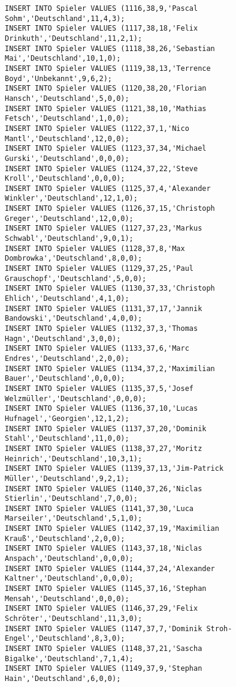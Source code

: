 \documentclass{bschlangaul-aufgabe}
\begin{document}
\begin{verbatim}
INSERT INTO Spieler VALUES (1116,38,9,'Pascal Sohm','Deutschland',11,4,3);
INSERT INTO Spieler VALUES (1117,38,18,'Felix Drinkuth','Deutschland',11,2,1);
INSERT INTO Spieler VALUES (1118,38,26,'Sebastian Mai','Deutschland',10,1,0);
INSERT INTO Spieler VALUES (1119,38,13,'Terrence Boyd','Unbekannt',9,6,2);
INSERT INTO Spieler VALUES (1120,38,20,'Florian Hansch','Deutschland',5,0,0);
INSERT INTO Spieler VALUES (1121,38,10,'Mathias Fetsch','Deutschland',1,0,0);
INSERT INTO Spieler VALUES (1122,37,1,'Nico Mantl','Deutschland',12,0,0);
INSERT INTO Spieler VALUES (1123,37,34,'Michael Gurski','Deutschland',0,0,0);
INSERT INTO Spieler VALUES (1124,37,22,'Steve Kroll','Deutschland',0,0,0);
INSERT INTO Spieler VALUES (1125,37,4,'Alexander Winkler','Deutschland',12,1,0);
INSERT INTO Spieler VALUES (1126,37,15,'Christoph Greger','Deutschland',12,0,0);
INSERT INTO Spieler VALUES (1127,37,23,'Markus Schwabl','Deutschland',9,0,1);
INSERT INTO Spieler VALUES (1128,37,8,'Max Dombrowka','Deutschland',8,0,0);
INSERT INTO Spieler VALUES (1129,37,25,'Paul Grauschopf','Deutschland',5,0,0);
INSERT INTO Spieler VALUES (1130,37,33,'Christoph Ehlich','Deutschland',4,1,0);
INSERT INTO Spieler VALUES (1131,37,17,'Jannik Bandowski','Deutschland',4,0,0);
INSERT INTO Spieler VALUES (1132,37,3,'Thomas Hagn','Deutschland',3,0,0);
INSERT INTO Spieler VALUES (1133,37,6,'Marc Endres','Deutschland',2,0,0);
INSERT INTO Spieler VALUES (1134,37,2,'Maximilian Bauer','Deutschland',0,0,0);
INSERT INTO Spieler VALUES (1135,37,5,'Josef Welzmüller','Deutschland',0,0,0);
INSERT INTO Spieler VALUES (1136,37,10,'Lucas Hufnagel','Georgien',12,1,2);
INSERT INTO Spieler VALUES (1137,37,20,'Dominik Stahl','Deutschland',11,0,0);
INSERT INTO Spieler VALUES (1138,37,27,'Moritz Heinrich','Deutschland',10,3,1);
INSERT INTO Spieler VALUES (1139,37,13,'Jim-Patrick Müller','Deutschland',9,2,1);
INSERT INTO Spieler VALUES (1140,37,26,'Niclas Stierlin','Deutschland',7,0,0);
INSERT INTO Spieler VALUES (1141,37,30,'Luca Marseiler','Deutschland',5,1,0);
INSERT INTO Spieler VALUES (1142,37,19,'Maximilian Krauß','Deutschland',2,0,0);
INSERT INTO Spieler VALUES (1143,37,18,'Niclas Anspach','Deutschland',0,0,0);
INSERT INTO Spieler VALUES (1144,37,24,'Alexander Kaltner','Deutschland',0,0,0);
INSERT INTO Spieler VALUES (1145,37,16,'Stephan Mensah','Deutschland',0,0,0);
INSERT INTO Spieler VALUES (1146,37,29,'Felix Schröter','Deutschland',11,3,0);
INSERT INTO Spieler VALUES (1147,37,7,'Dominik Stroh-Engel','Deutschland',8,3,0);
INSERT INTO Spieler VALUES (1148,37,21,'Sascha Bigalke','Deutschland',7,1,4);
INSERT INTO Spieler VALUES (1149,37,9,'Stephan Hain','Deutschland',6,0,0);

\end{verbatim}
\end{document}
